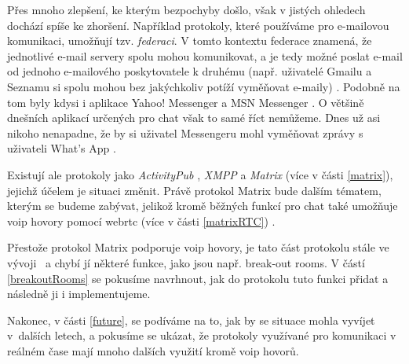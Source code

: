 Přes mnoho zlepšení, ke kterým bezpochyby došlo, však v jistých ohledech dochází
spíše ke zhoršení. Například protokoly, které používáme pro e-mailovou
komunikaci, umožňují tzv. \textit{federaci}. V tomto kontextu federace znamená,
že jednotlivé e-mail servery spolu mohou komunikovat, a je tedy možné poslat
e-mail od jednoho e-mailového poskytovatele k druhému (např. uživatelé Gmailu a
Seznamu si spolu mohou bez jakýchkoliv potíží vyměňovat e-maily)
\parencite{MatrixORG-FAQ}. Podobně na tom byly kdysi i aplikace Yahoo! Messenger
a MSN Messenger \parencite{BetaNews-MSYahooToLinkIMNets}. O většině dnešních
aplikací určených pro chat však to samé říct nemůžeme. Dnes už asi nikoho
nenapadne, že by si uživatel Messengeru mohl vyměňovat zprávy s uživateli What's
App \parencite{9To5Mac-InteroperabilityNightmareAndDream}.

Existují ale protokoly jako \textit{ActivityPub} \parencite{W3ORG-ActivityPub},
\textit{XMPP} \parencite{XMPPORG-Homepage} a \textit{Matrix}
\parencite{MatrixORG-Homepage} (více v části \ref{matrix}), jejichž účelem je
situaci změnit. Právě protokol Matrix bude dalším tématem, kterým se budeme
zabývat, jelikož kromě běžných funkcí pro chat také umožňuje \gls{voip} hovory
pomocí \gls{webrtc} (více v části \ref{matrixRTC})
\parencite{MatrixORG-Homepage,MatrixORG-Spec}.

Přestože protokol Matrix podporuje \gls{voip} hovory, je tato část protokolu
stále ve vývoji~\parencite{GitHub-MSC3401,GitHub-MSC3898} a chybí jí některé
funkce, jako jsou např. break-out rooms. V částí \ref{breakoutRooms} se pokusíme
navrhnout, jak do protokolu tuto funkci přidat a následně ji i implementujeme.

Nakonec, v části \ref{future}, se podíváme na to, jak by se situace mohla
vyvíjet v~dalších letech, a pokusíme se ukázat, že protokoly využívané pro
komunikaci v reálném čase mají mnoho dalších využití kromě \gls{voip} hovorů.
